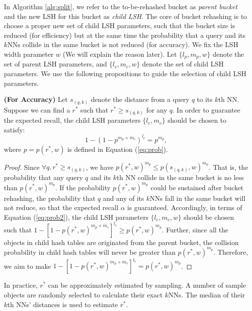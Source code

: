 In Algorithm \ref{alg:split}, we refer to the to-be-rehashed bucket as \emph{parent bucket} and the new LSH for this bucket as \emph{child LSH}. The core of bucket rehashing is to choose a proper new set of child LSH parameters, such that the bucket size is reduced (for efficiency) but at the same time the probability that a query and its $k$NNs collide in the same bucket is not reduced (for accuracy). We fix the LSH width parameter $w$ (We will explain the reason later). Let $\{l_p,m_p,w\}$ denote the set of parent LSH parameters, and $\{l_c,m_c,w\}$ denote the set of child LSH parameters. We use the following propositions to guide the selection of child LSH parameters.

\begin{prop}
\label{prop:accuracy}
\textbf{(For Accuracy)} Let $s_{(q,k)}$ denote the distance from a query $q$ to its $k$th NN. Suppose we can find a $r^*$ such that $r^*\geq s_{(q,k)}$ for any $q$. In order to guarantee the expected recall, the child LSH parameters $\{l_c,m_c\}$ should be chosen to satisfy:
\begin{equation}\label{eq:sustainprob}
    1-(1-p^{m_p+m_{c}})^{l_{c}}=p^{m_{p}},
\end{equation}
where $p=p(r^*,w)$ is defined in Equation (\ref{eq:prob}).
\end{prop}
\begin{proof}
Since $\forall q, r^*\geq s_{(q,k)}$, we have $p(r^*,w)^{m_p}\leq p(s_{(q,k)},w)^{m_p}$. That is, the probability that any query $q$ and its $k$th NN collide in the same bucket is no less than $p(r^*,w)^{m_p}$. If the probability $p(r^*,w)^{m_p}$ could be sustained after bucket rehashing, the probability that $q$ and any of its $k$NNs fall in the same bucket will not reduce, so that the expected recall $\alpha$ is guaranteed. Accordingly, in terms of Equation (\ref{eq:prob2}), the child LSH parameters $\{l_c,m_c,w\}$ should be chosen such that $1-[1-p(r^*,w)^{m_p+m_{c}}]^{l_{c}}\geq p(r^*,w)^{m_{p}}$. Further, since all the objects in child hash tables are originated from the parent bucket, the collision probability in child hash tables will never be greater than $p(r^*,w)^{m_{p}}$. Therefore, we aim to make $1-[1-p(r^*,w)^{m_p+m_{c}}]^{l_{c}}=p(r^*,w)^{m_{p}}$.
\end{proof}

In practice, $r^*$ can be approximately estimated by sampling. A number of sample objects are randomly selected to calculate their exact $k$NNs. The median of their $k$th NNs' distances is used to estimate $r^*$.

